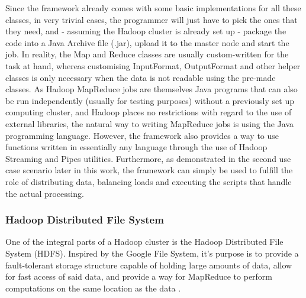 \documentclass [12pt,a4paper]{report}
\begin{document}
Since the framework already comes with some basic implementations for all these classes, in very trivial cases, the programmer will just have to pick the ones that they need, and - assuming the Hadoop cluster is already set up - package the code into a Java Archive file (.jar), upload it to the master node and start the job. In reality, the Map and Reduce classes are usually custom-written for the task at hand, whereas customising InputFormat, OutputFormat and other helper classes is only necessary when the data is not readable using the pre-made classes. As Hadoop MapReduce jobs are themselves Java programs that can also be run independently (usually for testing purposes) without a previously set up computing cluster, and Hadoop places no restrictions with regard to the use of external libraries, the natural way to writing MapReduce jobs is using the Java programming language. However, the framework also provides a way to use functions written in essentially any language through the use of Hadoop Streaming and Pipes utilities. Furthermore, as demonstrated in the second use case scenario later in this work, the framework can simply be used to fulfill the role of distributing data, balancing loads and executing the scripts that handle the actual processing.

\subsubsection{Hadoop Distributed File System}

One of the integral parts of a Hadoop cluster is the Hadoop Distributed File System (HDFS). Inspired by the Google File System, it's purpose is to provide a fault-tolerant storage structure capable of holding large amounts of data, allow for fast access of said data, and provide a way for MapReduce to perform computations on the same location as the data \cite{ghemawat2003google,borthakur2007hadoop}. 
\end{document}
